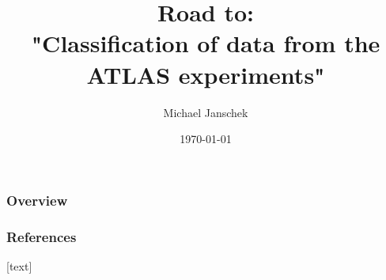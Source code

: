 \documentclass[10pt]{beamer}
\begin{document}
\title{Road to: \\ "Classiﬁcation of data from the ATLAS experiments"}
\author{Michael Janschek}
\date{\today}

	\begin{frame}
		\maketitle
	\end{frame}
	
	\begin{frame}
		\frametitle{Overview}
		\tableofcontents
	\end{frame}
	
	
	
	
	
	
	\begin{frame}[allowframebreaks]
		\frametitle{References}
		
				
	\end{frame}
	
\end{document}

